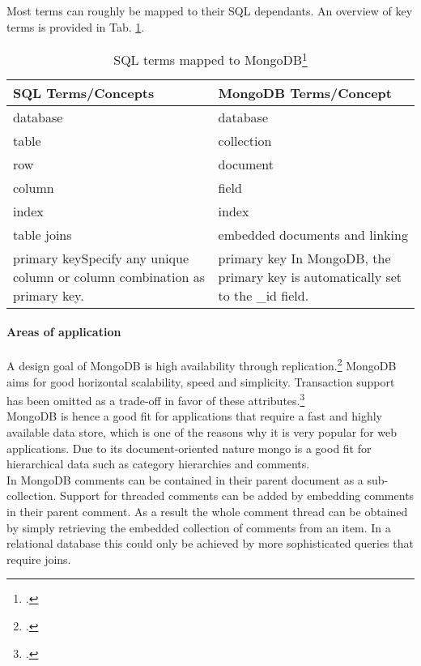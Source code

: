 Most terms can roughly be mapped to their SQL dependants. An overview of key terms
is provided in Tab. \ref{tab:sql-mongo-map}.

\begin{table}[ht]
\begin{tabular*}{0.95\textwidth}{p{} p{}}
\toprule
\textbf{SQL Terms/Concepts} & \textbf{MongoDB Terms/Concept}\\
\midrule 
database & 	database\\
table 	 &	collection\\
row 	 &	document\\
column 	 &	field\\
index 	 &	index\\
table joins &	embedded documents and linking\\
primary key\newline Specify any unique column or column combination as primary
key.
		&
primary key\newline
In MongoDB, the primary key is automatically set to the \_id field.\\

\bottomrule 
\end{tabular*}
  \begin{savenotes}
  \caption[SQL terms mapped to MongoDB]{SQL terms mapped to
  MongoDB\footcite[][]{mongo_sql_comp} }
  \label{tab:sql-mongo-map}
  \end{savenotes}
\end{table}


\paragraph{Areas of application}
A design goal of MongoDB is high availability through
replication.\footcite[Cf.][3]{Plugge_2010}
MongoDB aims for good horizontal scalability, speed and simplicity. Transaction
support has been omitted as a trade-off in favor of these
attributes.\footcite[Cf.][5]{Plugge_2010}\\
MongoDB is hence a good fit for applications that require a fast and highly
available data store, which is one of the reasons why it is very popular for web
applications. Due to its document-oriented nature mongo is a good fit for
hierarchical data such as category hierarchies and comments.\\
In MongoDB comments can be contained in their parent document as a
sub-collection. Support for threaded comments can be added by embedding comments
in their parent comment. As a result the whole comment thread can be obtained
 by simply retrieving the embedded collection of comments from an item.
In a relational database this could only be achieved by more sophisticated
queries that require joins.

